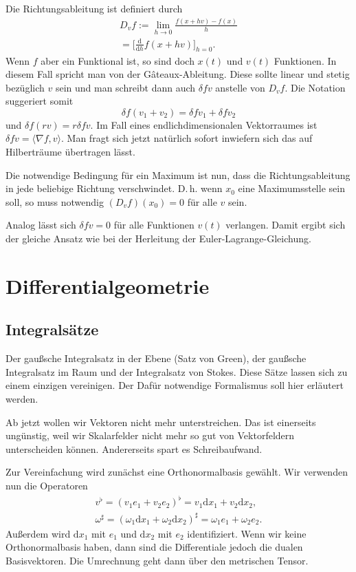 \documentclass[a4paper,10pt,fleqn,twocolumn,twoside]{article}
\numberwithin{equation}{section}
\begin{document}
Die Richtungsableitung ist definiert durch
\begin{gather*}
D_v f := \lim_{h\rightarrow 0} \frac{f(x+hv)-f(x)}{h}\\
= \Big[\frac{\mathrm d}{\mathrm dh}f(x+hv)\Big]_{h=0}.
\end{gather*}
Wenn $f$ aber ein Funktional ist, so sind doch $x(t)$ und $v(t)$
Funktionen. In diesem Fall spricht man von der Gâteaux-Ableitung.
Diese sollte linear und stetig bezüglich $v$ sein und man schreibt dann
auch $\delta f v$ anstelle von $D_v f$. Die Notation suggeriert
somit
\begin{equation}
\delta f(v_1+v_2) = \delta fv_1 + \delta fv_2
\end{equation}
und $\delta f(rv) = r\delta fv$. Im Fall eines endlichdimensionalen
Vektorraumes ist $\delta f v = \langle \nabla f,v\rangle$. Man
fragt sich jetzt natürlich sofort inwiefern sich das auf
Hilberträume übertragen lässt.

Die notwendige Bedingung für ein Maximum ist nun, dass die
Richtungsableitung in jede beliebige Richtung verschwindet. D.\,h.
wenn $x_0$ eine Maximumsstelle sein soll, so muss notwendig
$(D_v f)(x_0)=0$ für alle $v$ sein.

Analog lässt sich
$\delta fv=0$ für alle Funktionen $v(t)$ verlangen.
Damit ergibt sich der gleiche Ansatz wie bei der Herleitung
der Euler-Lagrange-Gleichung.


\newpage
\section{Differentialgeometrie}

\subsection{Integralsätze}

Der gaußsche Integralsatz in der Ebene (Satz von Green), der gaußsche
Integralsatz im Raum und der Integralsatz von Stokes. Diese
Sätze lassen sich zu einem einzigen vereinigen. Der Dafür notwendige
Formalismus soll hier erläutert werden.

Ab jetzt wollen wir Vektoren nicht mehr unterstreichen. Das ist
einerseits ungünstig, weil wir Skalarfelder nicht mehr so gut von
Vektorfeldern unterscheiden können. Andererseits spart es
Schreibaufwand.

Zur Vereinfachung wird zunächst eine Orthonormalbasis gewählt.
Wir verwenden nun die Operatoren
\begin{gather*}
v^\flat = (v_1e_1+v_2e_2)^\flat
= v_1\mathrm dx_1+v_2\mathrm dx_2,\\
\omega^\sharp
= (\omega_1\mathrm dx_1+\omega_2\mathrm dx_2)^\sharp
= \omega_1e_1+\omega_2e_2.
\end{gather*}
Außerdem wird $\mathrm dx_1$ mit $e_1$ und $\mathrm dx_2$
mit $e_2$ identifiziert. Wenn wir keine Orthonormalbasis haben,
dann sind die Differentiale jedoch die dualen Basisvektoren.
Die Umrechnung geht dann über den metrischen Tensor.
\end{document}
